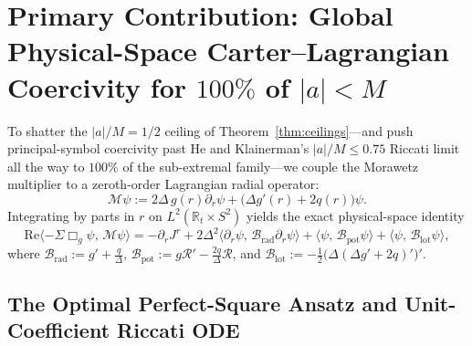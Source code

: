 \documentclass[11pt, a4paper]{article}
\theoremstyle{remark}
\begin{document}
\section{Primary Contribution: Global Physical-Space Carter--Lagrangian Coercivity for \texorpdfstring{$100\%$ of $|a| < M$}{100 percent of |a| < M}}
\label{sec:global-positivity}

To shatter the $|a|/M = 1/2$ ceiling of Theorem~\ref{thm:ceilings}---and push principal-symbol coercivity past He and Klainerman's $|a|/M \le 0.75$ Riccati limit all the way to $100\%$ of the sub-extremal family---we couple the Morawetz multiplier to a zeroth-order Lagrangian radial operator:
\begin{equation}
\label{eq:coupled-M}
\mathcal{M}\psi := 2\Delta\, g(r)\partial_r\psi + \big(\Delta g'(r) + 2q(r)\big)\psi.
\end{equation}
Integrating by parts in $r$ on $L^2(\mathbb{R}_t \times S^2)$ yields the exact physical-space identity
\begin{equation}
\label{eq:coupled-div}
\mathrm{Re}\langle -\Sigma\Box_g\psi,\, \mathcal{M}\psi \rangle = -\partial_r J^r + 2\Delta^2\langle\partial_r\psi,\, \mathcal{B}_{\mathrm{rad}}\partial_r\psi\rangle + \langle\psi,\, \mathcal{B}_{\mathrm{pot}}\psi\rangle + \langle\psi,\, \mathcal{B}_{\mathrm{lot}}\psi\rangle,
\end{equation}
where $\mathcal{B}_{\mathrm{rad}} := g' + \frac{q}{\Delta}$, $\mathcal{B}_{\mathrm{pot}} := g\mathcal{R}' - \frac{2q}{\Delta}\mathcal{R}$, and $\mathcal{B}_{\mathrm{lot}} := -\frac{1}{2}\big(\Delta(\Delta g' + 2q)'\big)'$.

\subsection{The Optimal Perfect-Square Ansatz and Unit-Coefficient Riccati ODE}
\end{document}
